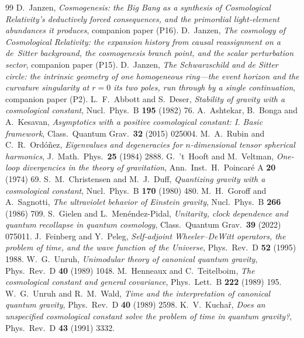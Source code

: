 \documentclass[11pt,a4paper]{article}
\theoremstyle{plain}
\theoremstyle{definition}
\theoremstyle{remark}
\begin{document}
\begin{thebibliography}{99}
 D.~Janzen, \emph{Cosmogenesis: the Big Bang as a synthesis of Cosmological Relativity's deductively forced consequences, and the primordial light-element abundances it produces}, companion paper (P16).
 D.~Janzen, \emph{The cosmology of Cosmological Relativity: the expansion history from causal reassignment on a de~Sitter background, the cosmogenesis branch point, and the scalar perturbation sector}, companion paper (P15).
D.~Janzen,
\emph{The Schwarzschild and de Sitter circle: the intrinsic geometry of one homogeneous ring---the event horizon and the curvature singularity at $r=0$ its two poles, run through by a single continuation}, companion paper (P2).
 L.~F.~Abbott and S.~Deser, \emph{Stability of gravity with a cosmological constant}, Nucl.\ Phys.\ B \textbf{195} (1982) 76.
 A.~Ashtekar, B.~Bonga and A.~Kesavan, \emph{Asymptotics with a positive cosmological constant: I. Basic framework}, Class.\ Quantum Grav.\ \textbf{32} (2015) 025004.
 M.~A.~Rubin and C.~R.~Ord\'o\~nez, \emph{Eigenvalues and degeneracies for $n$-dimensional tensor spherical harmonics}, J.\ Math.\ Phys.\ \textbf{25} (1984) 2888.
 G.~'t~Hooft and M.~Veltman, \emph{One-loop divergencies in the theory of gravitation}, Ann.\ Inst.\ H.\ Poincar\'e A \textbf{20} (1974) 69.
 S.~M.~Christensen and M.~J.~Duff, \emph{Quantizing gravity with a cosmological constant}, Nucl.\ Phys.\ B \textbf{170} (1980) 480.
 M.~H.~Goroff and A.~Sagnotti, \emph{The ultraviolet behavior of Einstein gravity}, Nucl.\ Phys.\ B \textbf{266} (1986) 709.
 S.~Gielen and L.~Men\'endez-Pidal, \emph{Unitarity, clock dependence and quantum recollapse in quantum cosmology}, Class.\ Quantum Grav.\ \textbf{39} (2022) 075011.
 J.~Feinberg and Y.~Peleg, \emph{Self-adjoint Wheeler--DeWitt operators, the problem of time, and the wave function of the Universe}, Phys.\ Rev.\ D \textbf{52} (1995) 1988.
 W.~G.~Unruh, \emph{Unimodular theory of canonical quantum gravity}, Phys.\ Rev.\ D \textbf{40} (1989) 1048.
 M.~Henneaux and C.~Teitelboim, \emph{The cosmological constant and general covariance}, Phys.\ Lett.\ B \textbf{222} (1989) 195.
 W.~G.~Unruh and R.~M.~Wald, \emph{Time and the interpretation of canonical quantum gravity}, Phys.\ Rev.\ D \textbf{40} (1989) 2598.
 K.~V.~Kucha\v{r}, \emph{Does an unspecified cosmological constant solve the problem of time in quantum gravity?}, Phys.\ Rev.\ D \textbf{43} (1991) 3332.
\end{thebibliography}



\end{document}
